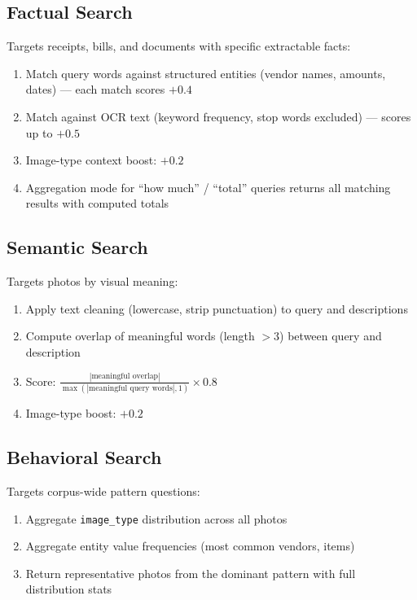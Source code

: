 \documentclass[11pt,letterpaper]{article}
\begin{document}
\subsection{Factual Search}

Targets receipts, bills, and documents with specific extractable facts:
\begin{enumerate}[nosep]
  \item Match query words against structured entities (vendor names, amounts, dates) --- each match scores $+0.4$
  \item Match against OCR text (keyword frequency, stop words excluded) --- scores up to $+0.5$
  \item Image-type context boost: $+0.2$
  \item Aggregation mode for ``how much'' / ``total'' queries returns all matching results with computed totals
\end{enumerate}

\subsection{Semantic Search}

Targets photos by visual meaning:
\begin{enumerate}[nosep]
  \item Apply text cleaning (lowercase, strip punctuation) to query and descriptions
  \item Compute overlap of meaningful words (length $> 3$) between query and description
  \item Score: $\frac{|\text{meaningful overlap}|}{\max(|\text{meaningful query words}|, 1)} \times 0.8$
  \item Image-type boost: $+0.2$
\end{enumerate}

\subsection{Behavioral Search}

Targets corpus-wide pattern questions:
\begin{enumerate}[nosep]
  \item Aggregate \texttt{image\_type} distribution across all photos
  \item Aggregate entity value frequencies (most common vendors, items)
  \item Return representative photos from the dominant pattern with full distribution stats
\end{enumerate}
\end{document}
